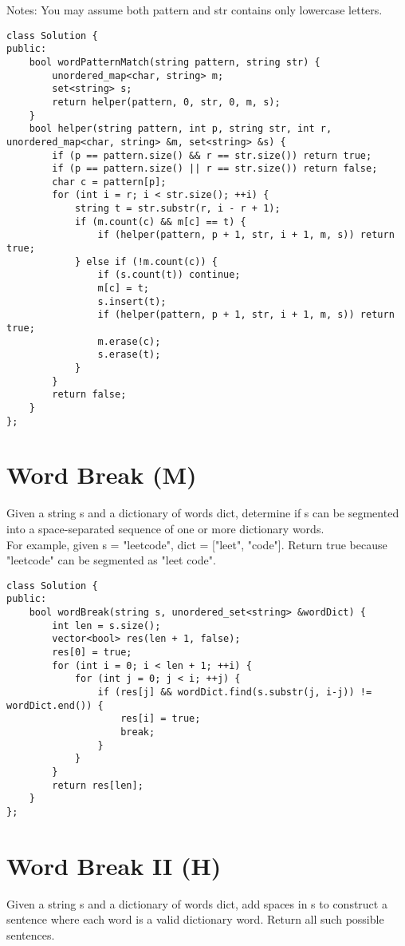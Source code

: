 Notes: You may assume both pattern and str contains only lowercase letters.\\

\begin{lstlisting}
class Solution {
public:
    bool wordPatternMatch(string pattern, string str) {
        unordered_map<char, string> m;
        set<string> s;
        return helper(pattern, 0, str, 0, m, s);
    }
    bool helper(string pattern, int p, string str, int r, unordered_map<char, string> &m, set<string> &s) {
        if (p == pattern.size() && r == str.size()) return true;
        if (p == pattern.size() || r == str.size()) return false;
        char c = pattern[p];
        for (int i = r; i < str.size(); ++i) {
            string t = str.substr(r, i - r + 1);
            if (m.count(c) && m[c] == t) {
                if (helper(pattern, p + 1, str, i + 1, m, s)) return true;
            } else if (!m.count(c)) {
                if (s.count(t)) continue;
                m[c] = t;
                s.insert(t);
                if (helper(pattern, p + 1, str, i + 1, m, s)) return true;
                m.erase(c);
                s.erase(t);
            }
        }
        return false;
    }
};
\end{lstlisting}


\section{Word Break (M)}
Given a string s and a dictionary of words dict, determine if s can be segmented into a space-separated sequence of one or more dictionary words.\\

For example, given
s = "leetcode",
dict = ["leet", "code"].
Return true because "leetcode" can be segmented as "leet code". \\

\begin{lstlisting}
class Solution {
public:
    bool wordBreak(string s, unordered_set<string> &wordDict) {
        int len = s.size();
        vector<bool> res(len + 1, false);
        res[0] = true;
        for (int i = 0; i < len + 1; ++i) {
            for (int j = 0; j < i; ++j) {
                if (res[j] && wordDict.find(s.substr(j, i-j)) != wordDict.end()) {
                    res[i] = true;
                    break;
                }
            }
        }
        return res[len];
    }
};
\end{lstlisting}


\section{Word Break II (H)}
Given a string s and a dictionary of words dict, add spaces in s to construct a sentence where each word is a valid dictionary word. Return all such possible sentences.

